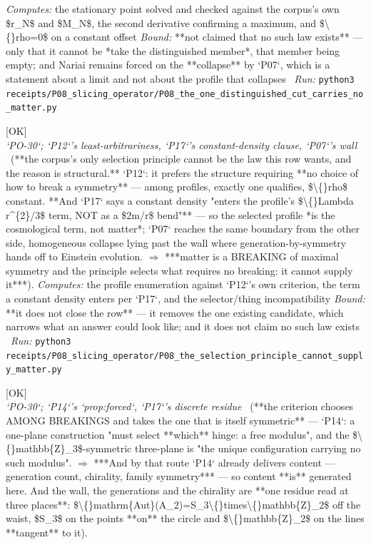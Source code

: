 \begin{description}
\emph{Computes:} the stationary point solved and checked against the corpus's own \$r\_N\$ and \$M\_N\$, the second derivative confirming a maximum, and \$\textbackslash\{\}rho=0\$ on a constant offset
 \emph{Bound:} **not claimed that no such law exists** --- only that it cannot be *take the distinguished member*, that member being empty; and Nariai remains forced on the **collapse** by `P07`, which is a statement about a limit and not about the profile that collapses
\ \emph{Run:} \texttt{python3 receipts/P08\_slicing\_operator/P08\_the\_one\_distinguished\_cut\_carries\_no\_matter.py}
\item[\rcptlabel{P08_the_selection_principle_cannot_supply_matter}{P8R11}\textbf{P8R11}\quad\texttt{P08\_the\_selection\_principle\_cannot\_supply\_matter}]\hfill\textsf{[OK]}\\
\textit{`PO-30`; `P12`'s least-arbitrariness, `P17`'s constant-density clause, `P07`'s wall} \ (**the corpus's only selection principle cannot be the law this row wants, and the reason is structural.** `P12`: it prefers the structure requiring **no choice of how to break a symmetry** --- among profiles, exactly one qualifies, \$\textbackslash\{\}rho\$ constant. **And `P17` says a constant density "enters the profile's \$\textbackslash\{\}Lambda r\textasciicircum{}\{2\}/3\$ term, NOT as a \$2m/r\$ bend"** --- so the selected profile *is the cosmological term, not matter*; `P07` reaches the same boundary from the other side, homogeneous collapse lying past the wall where generation-by-symmetry hands off to Einstein evolution. \ensuremath{\Rightarrow} ***matter is a BREAKING of maximal symmetry and the principle selects what requires no breaking: it cannot supply it***). 
\emph{Computes:} the profile enumeration against `P12`'s own criterion, the term a constant density enters per `P17`, and the selector/thing incompatibility
 \emph{Bound:}  **it does not close the row** --- it removes the one existing candidate, which narrows what an answer could look like; and it does not claim no such law exists
\ \emph{Run:} \texttt{python3 receipts/P08\_slicing\_operator/P08\_the\_selection\_principle\_cannot\_supply\_matter.py}
\item[\rcptlabel{P08_the_construction_already_generates_content_and_how}{P8R12}\textbf{P8R12}\quad\texttt{P08\_the\_construction\_already\_generates\_content\_and\_how}]\hfill\textsf{[OK]}\\
\textit{`PO-30`; `P14`'s `prop:forced`, `P17`'s discrete residue} \ (**the criterion chooses AMONG BREAKINGS and takes the one that is itself symmetric** --- `P14`: a one-plane construction "must select **which** hinge: a free modulus", and the \$\textbackslash\{\}mathbb\{Z\}\_3\$-symmetric three-plane is "the unique configuration carrying no such modulus". \ensuremath{\Rightarrow} ***And by that route `P14` already delivers content --- generation count, chirality, family symmetry*** --- so content **is** generated here. And the wall, the generations and the chirality are **one residue read at three places**: \$\textbackslash\{\}mathrm\{Aut\}(A\_2)=S\_3\textbackslash\{\}times\textbackslash\{\}mathbb\{Z\}\_2\$ off the waist, \$S\_3\$ on the points **on** the circle and \$\textbackslash\{\}mathbb\{Z\}\_2\$ on the lines **tangent** to it). 

\end{description}
